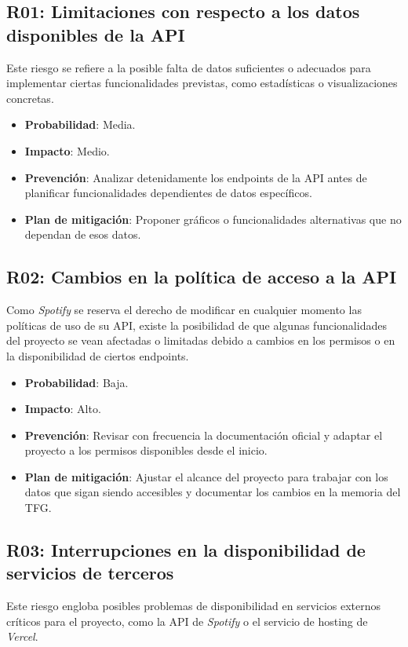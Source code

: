 \subsection{R01: Limitaciones con respecto a los datos disponibles de la API}
Este riesgo se refiere a la posible falta de datos suficientes o adecuados para implementar ciertas funcionalidades previstas, como estadísticas o visualizaciones concretas.

\begin{itemize}
    \item \textbf{Probabilidad}: Media.
    \item \textbf{Impacto}: Medio.
    \item \textbf{Prevención}: Analizar detenidamente los endpoints de la API antes de planificar funcionalidades dependientes de datos específicos.
    \item \textbf{Plan de mitigación}: Proponer gráficos o funcionalidades alternativas que no dependan de esos datos.
\end{itemize}

\subsection{R02: Cambios en la política de acceso a la API}
Como \textit{Spotify} se reserva el derecho de modificar en cualquier momento las políticas de uso de su API, existe la posibilidad de que algunas funcionalidades del proyecto se vean afectadas o limitadas debido a cambios en los permisos o en la disponibilidad de ciertos endpoints.

\begin{itemize}
    \item \textbf{Probabilidad}: Baja.
    \item \textbf{Impacto}: Alto.
    \item \textbf{Prevención}: Revisar con frecuencia la documentación oficial y adaptar el proyecto a los permisos disponibles desde el inicio.
    \item \textbf{Plan de mitigación}: Ajustar el alcance del proyecto para trabajar con los datos que sigan siendo accesibles y documentar los cambios en la memoria del TFG.
\end{itemize}

\subsection{R03: Interrupciones en la disponibilidad de servicios de terceros}
Este riesgo engloba posibles problemas de disponibilidad en servicios externos críticos para el proyecto, como la API de \textit{Spotify} o el servicio de hosting de \textit{Vercel}.


